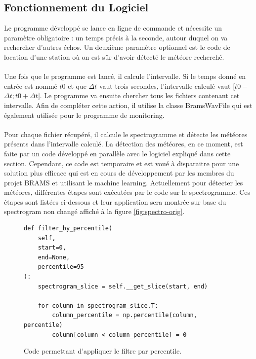 \documentclass[11pt]{article}
\begin{document}
\subsection{Fonctionnement du Logiciel}

Le programme développé se lance en ligne de commande et nécessite un paramètre obligatoire : un temps précis à la seconde, autour duquel on va rechercher d'autres échos.
Un deuxième paramètre optionnel est le code de location d'une station où on est sûr d'avoir détecté le météore recherché.\\
\\
Une fois que le programme est lancé, il calcule l'intervalle.
Si le temps donné en entrée est nommé \(t0\) et que $\Delta$\(t\) vaut trois secondes, l'intervalle calculé vaut \([t0 - \)$\Delta$\(t ; t0 + \)$\Delta$\(t]\).
Le programme va ensuite chercher tous les fichiers contenant cet intervalle.
Afin de compléter cette action, il utilise la classe BramsWavFile qui est également utilisée pour le programme de monitoring.\\
\\
Pour chaque fichier récupéré, il calcule le spectrogramme et détecte les météores présents dans l'intervalle calculé.
La détection des météores, en ce moment, est faite par un code développé en parallèle avec le logiciel expliqué dans cette section.
Cependant, ce code est temporaire et est voué à disparaitre pour une solution plus efficace qui est en cours de développement par les membres du projet BRAMS et utilisant le machine learning.
Actuellement pour détecter les météores, différentes étapes sont exécutées par le code sur le spectrogramme.
Ces étapes sont listées ci-dessous et leur application sera montrée sur base du spectrogram non changé affiché à la figure \ref{fig:spectro-orig}.

\begin{figure}[h]
    \begin{lstlisting}[style=CStyle]
def filter_by_percentile(
    self,
    start=0,
    end=None,
    percentile=95
):
    spectrogram_slice = self.__get_slice(start, end)

    for column in spectrogram_slice.T:
        column_percentile = np.percentile(column, percentile)
        column[column < column_percentile] = 0
    \end{lstlisting}
    \caption{Code permettant d'appliquer le filtre par percentile.}
    \label{fig:percentile-code}
\end{figure}
\end{document}
